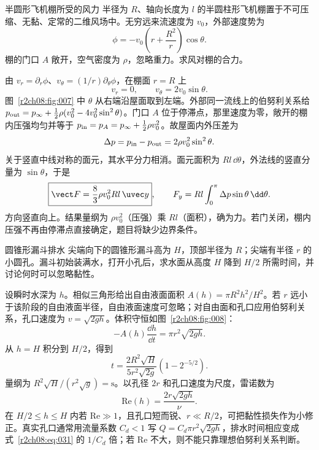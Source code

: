 \begin{practicebox}{半圆形飞机棚所受的风力}
半径为 $R$、轴向长度为 $l$ 的半圆柱形飞机棚置于不可压缩、无黏、定常的二维风场中。无穷远来流速度为 $v_0$，外部速度势为
\[
 \phi=-v_0\left(r+\frac{R^2}{r}\right)\cos\theta .
\]
棚的门口 $A$ 敞开，空气密度为 $\rho$，忽略重力。求风对棚的合力。
\label{r2ch08:pr:003}
\begin{solution}
由 $v_r=\partial_r\phi$、$v_\theta=(1/r)\partial_\theta\phi$，在棚面 $r=R$ 上
\begin{equation}
 v_r=0,\qquad v_\theta=2v_0\sin\theta.
 \label{r2ch08:eq:027}
\end{equation}
图~\ref{r2ch08:fig:007} 中 $\theta$ 从右端沿屋面取到左端。外部同一流线上的伯努利关系给
$p_{\rm out}=p_\infty+\tfrac12\rho(v_0^2-4v_0^2\sin^2\theta)$。门口 $A$ 位于停滞点，那里速度为零，敞开的棚内压强均匀并等于
$p_{\rm in}=p_A=p_\infty+\tfrac12\rho v_0^2$。故屋面内外压差为
\begin{equation}
 \Delta p=p_{\rm in}-p_{\rm out}=2\rho v_0^2\sin^2\theta.
 \label{r2ch08:eq:028}
\end{equation}
关于竖直中线对称的面元，其水平分力相消。面元面积为 $Rl\,\dd\theta$，外法线的竖直分量为 $\sin\theta$，于是
\begin{equation}
 \boxed{\vect F=\frac83\rho v_0^2Rl\,\uvec y},
 \qquad
 F_y=Rl\int_0^\pi\Delta p\sin\theta\,\dd\theta.
 \label{r2ch08:eq:029}
\end{equation}
方向竖直向上。结果量纲为 $\rho v_0^2$（压强）乘 $Rl$（面积），确为力。若门关闭，棚内压强不再由停滞点直接确定，题目将缺少边界条件。
\figHangar
\end{solution}
\end{practicebox}

\begin{practicebox}{圆锥形漏斗排水}
尖端向下的圆锥形漏斗高为 $H$，顶部半径为 $R$；尖端有半径 $r$ 的小圆孔。漏斗初始装满水，打开小孔后，求水面从高度 $H$ 降到 $H/2$ 所需时间，并讨论何时可以忽略黏性。
\label{r2ch08:pr:004}
\begin{solution}
设瞬时水深为 $h$。相似三角形给出自由液面面积
$A(h)=\pi R^2h^2/H^2$。若 $r$ 远小于该阶段的自由液面半径，自由液面速度可忽略；对自由面和孔口应用伯努利关系，孔口速度为 $v=\sqrt{2gh}$。体积守恒如图~\ref{r2ch08:fig:008}：
\begin{equation}
 -A(h)\frac{\dd h}{\dd t}=\pi r^2\sqrt{2gh}.
 \label{r2ch08:eq:030}
\end{equation}
从 $h=H$ 积分到 $H/2$，得到
\begin{equation}
 \boxed{t=\frac{2R^2\sqrt H}{5r^2\sqrt{2g}}
 \left(1-2^{-5/2}\right)}.
 \label{r2ch08:eq:031}
\end{equation}
量纲为 $R^2\sqrt H/(r^2\sqrt g)=\mathrm s$。以孔径 $2r$ 和孔口速度为尺度，雷诺数为
\begin{equation}
 \mathrm{Re}(h)=\frac{2r\sqrt{2gh}}\nu.
 \label{r2ch08:eq:032}
\end{equation}
在 $H/2\le h\le H$ 内若 $\mathrm{Re}\gg1$，且孔口短而锐、$r\ll R/2$，可把黏性损失作为小修正。真实孔口通常用流量系数 $C_d<1$ 写 $Q=C_d\pi r^2\sqrt{2gh}$，排水时间相应变成式~\eqref{r2ch08:eq:031} 的 $1/C_d$ 倍；若 $\mathrm{Re}$ 不大，则不能只靠理想伯努利关系判断。
\figFunnel
\end{solution}
\end{practicebox}

